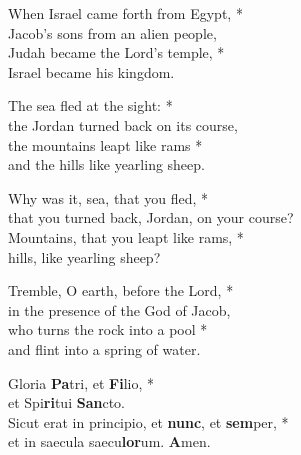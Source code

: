 
When Israel came forth from Egypt, *\\
Jacob’s sons from an alien people,\\
Judah became the Lord’s temple, *\\
Israel became his kingdom.

The sea fled at the sight: *\\
the Jordan turned back on its course,\\
the mountains leapt like rams *\\
and the hills like yearling sheep.

Why was it, sea, that you fled, *\\
that you turned back, Jordan, on your course?\\
Mountains, that you leapt like rams, *\\
hills, like yearling sheep?

Tremble, O earth, before the Lord, *\\
in the presence of the God of Jacob,\\
who turns the rock into a pool *\\
and flint into a spring of water.

Gloria \textbf{Pa}tri, et \textbf{Fi}lio, *\\
et Spi\textbf{ri}tui \textbf{San}cto. \\
Sicut erat in principio, et \textbf{nunc}, et \textbf{sem}per, *\\
et in saecula saecu\textbf{lor}um. \textbf{A}men.\\    
